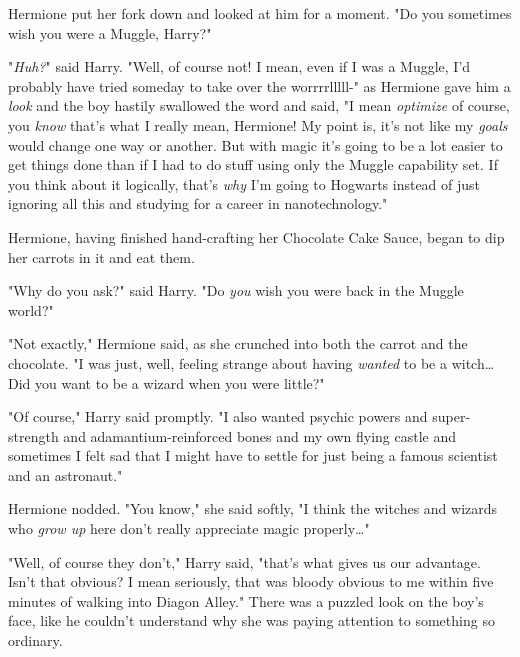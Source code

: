 Hermione put her fork down and looked at him for a moment. "Do you sometimes 
wish you were a Muggle, Harry?"

"\emph{Huh?}" said Harry. "Well, of course not! I mean, even if I was a Muggle, 
I'd probably have tried someday to take over the worrrrlllll-" as Hermione gave 
him a \emph{look} and the boy hastily swallowed the word and said, "I mean 
\emph{optimize} of course, you \emph{know} that's what I really mean, Hermione! 
My point is, it's not like my \emph{goals} would change one way or another. But 
with magic it's going to be a lot easier to get things done than if I had to do 
stuff using only the Muggle capability set. If you think about it logically, 
that's \emph{why} I'm going to Hogwarts instead of just ignoring all this and 
studying for a career in nanotechnology."

Hermione, having finished hand-crafting her Chocolate Cake Sauce, began to dip 
her carrots in it and eat them.

"Why do you ask?" said Harry. "Do \emph{you} wish you were back in the Muggle 
world?"

"Not exactly," Hermione said, as she crunched into both the carrot and the 
chocolate. "I was just, well, feeling strange about having \emph{wanted} to be 
a witch{\ldots} Did you want to be a wizard when you were little?"

"Of course," Harry said promptly. "I also wanted psychic powers and 
super-strength and adamantium-reinforced bones and my own flying castle and 
sometimes I felt sad that I might have to settle for just being a famous 
scientist and an astronaut."

Hermione nodded. "You know," she said softly, "I think the witches and wizards 
who \emph{grow up} here don't really appreciate magic properly{\ldots}"

"Well, of course they don't," Harry said, "that's what gives us our advantage. 
Isn't that obvious? I mean seriously, that was bloody obvious to me within five 
minutes of walking into Diagon Alley." There was a puzzled look on the boy's 
face, like he couldn't understand why she was paying attention to something so 
ordinary.